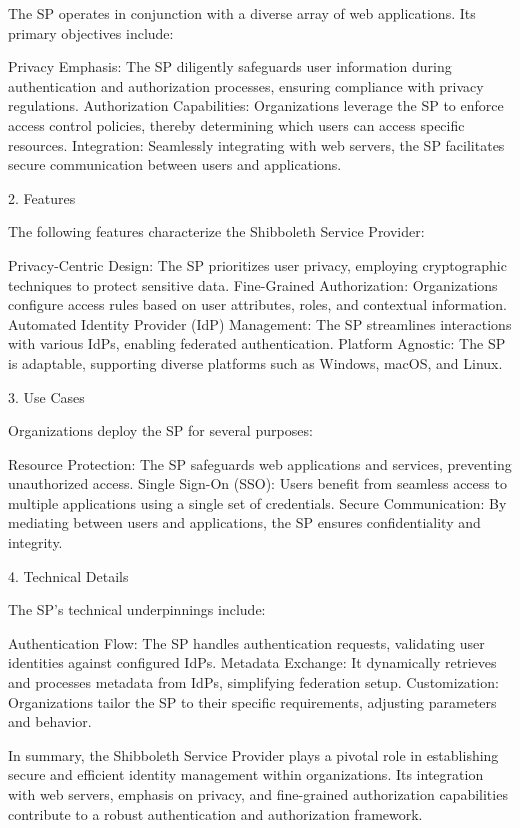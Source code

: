\documentclass{report}
\begin{document}
The SP operates in conjunction with a diverse array of web applications. Its primary objectives include:

    Privacy Emphasis: The SP diligently safeguards user information during authentication and authorization processes, ensuring compliance with privacy regulations.
    Authorization Capabilities: Organizations leverage the SP to enforce access control policies, thereby determining which users can access specific resources.
    Integration: Seamlessly integrating with web servers, the SP facilitates secure communication between users and applications.

2. Features

The following features characterize the Shibboleth Service Provider:

    Privacy-Centric Design: The SP prioritizes user privacy, employing cryptographic techniques to protect sensitive data.
    Fine-Grained Authorization: Organizations configure access rules based on user attributes, roles, and contextual information.
    Automated Identity Provider (IdP) Management: The SP streamlines interactions with various IdPs, enabling federated authentication.
    Platform Agnostic: The SP is adaptable, supporting diverse platforms such as Windows, macOS, and Linux.

3. Use Cases

Organizations deploy the SP for several purposes:

    Resource Protection: The SP safeguards web applications and services, preventing unauthorized access.
    Single Sign-On (SSO): Users benefit from seamless access to multiple applications using a single set of credentials.
    Secure Communication: By mediating between users and applications, the SP ensures confidentiality and integrity.

4. Technical Details

The SP’s technical underpinnings include:

    Authentication Flow: The SP handles authentication requests, validating user identities against configured IdPs.
    Metadata Exchange: It dynamically retrieves and processes metadata from IdPs, simplifying federation setup.
    Customization: Organizations tailor the SP to their specific requirements, adjusting parameters and behavior.

In summary, the Shibboleth Service Provider plays a pivotal role in establishing secure and efficient identity management within organizations. Its integration with web servers, emphasis on privacy, and fine-grained authorization capabilities contribute to a robust authentication and authorization framework.
\fi
\end{document}
